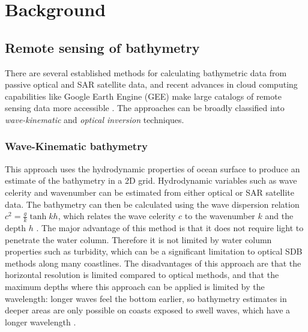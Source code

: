\chapter{Background}


\section{Remote sensing of bathymetry}
There are several established methods for calculating bathymetric data from passive optical and SAR satellite data, and recent advances in cloud computing capabilities like Google Earth Engine (GEE) \parencite{Gorelick2017a} make large catalogs of remote sensing data more accessible \parencite{Pike2019,Turner2021}. The approaches can be broadly classified into \emph{wave-kinematic} and \emph{optical inversion} techniques.

\subsection{Wave-Kinematic bathymetry}
This approach uses the hydrodynamic properties of ocean surface to produce an estimate of the bathymetry in a 2D grid. Hydrodynamic variables such as wave celerity and wavenumber can be estimated from either optical or SAR satellite data. The bathymetry can then be calculated using the wave dispersion relation $c^2 = \frac{g}{k}\tanh{kh}$, which relates the wave celerity $c$ to the wavenumber $k$ and the depth $h$ \parencite{Almar2021e}. The major advantage of this method is that it does not require light to penetrate the water column. Therefore it is not limited by water column properties such as turbidity, which can be a significant limitation to optical SDB methods along many coastlines. The disadvantages of this approach are that the horizontal resolution is limited compared to optical methods, and that the maximum depths where this approach can be applied is limited by the wavelength: longer waves feel the bottom earlier, so bathymetry estimates in deeper areas are only possible on coasts exposed to swell waves, which have a longer wavelength \parencite{Almar2021e}.

